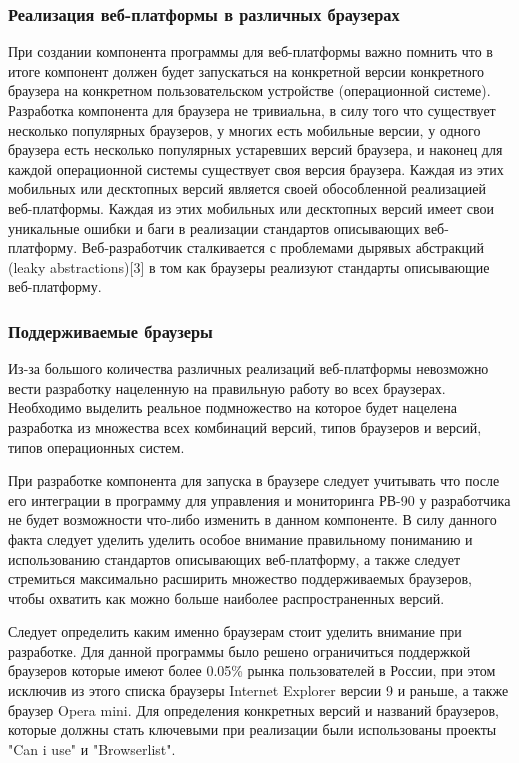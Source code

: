 \subsubsection{ Реализация веб-платформы в различных браузерах}
При создании компонента программы для веб-платформы важно помнить что в итоге компонент должен будет запускаться на конкретной версии конкретного браузера на конкретном пользовательском устройстве (операционной системе).
Разработка компонента для браузера не тривиальна, в силу того что существует несколько популярных браузеров, у многих есть мобильные версии, у одного браузера есть несколько популярных устаревших версий браузера, и наконец для каждой операционной системы существует своя версия браузера. Каждая из этих мобильных или десктопных версий является своей обособленной реализацией веб-платформы. Каждая из этих мобильных или десктопных версий имеет свои уникальные ошибки и баги в реализации стандартов описывающих веб-платформу. Веб-разработчик сталкивается с проблемами дырявых абстракций (leaky abstractions)[3] в том как браузеры реализуют стандарты описывающие веб-платформу.


\subsubsection{ Поддерживаемые браузеры}
Из-за большого количества различных реализаций веб-платформы невозможно вести разработку нацеленную на правильную работу во всех браузерах. Необходимо выделить реальное подмножество на которое будет нацелена разработка из множества всех комбинаций версий, типов браузеров и версий, типов операционных систем.

При разработке компонента для запуска в браузере следует учитывать что после его интеграции в программу для управления и мониторинга РВ-90 у разработчика не будет возможности что-либо изменить в данном компоненте. В силу данного факта следует уделить уделить особое внимание правильному пониманию и использованию стандартов описывающих веб-платформу, а также следует стремиться максимально расширить множество поддерживаемых браузеров, чтобы охватить как можно больше наиболее распространенных версий.

Следует определить каким именно браузерам стоит уделить внимание при разработке. 
Для данной программы было решено ограничиться поддержкой браузеров которые имеют более 0.05\% рынка пользователей в России, при этом исключив из этого списка браузеры Internet Explorer версии 9 и раньше, а также браузер Opera mini. Для определения конкретных версий и названий браузеров, которые должны стать ключевыми при реализации были использованы проекты "Can i use" и "Browserlist".

